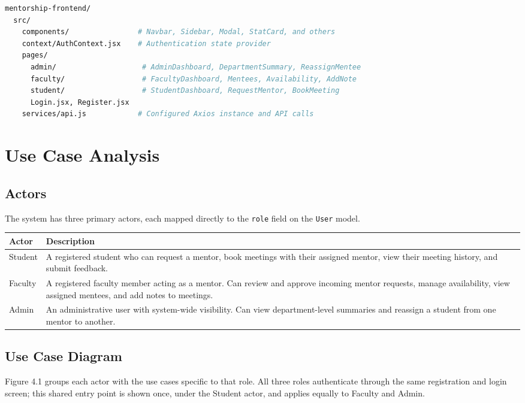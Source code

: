 \documentclass[12pt,a4paper]{report}
\newcommand{\sectionrule}{\vspace{-4pt}{\color{lightgray}\hrule height 1pt}\vspace{8pt}}
\begin{document}
\begin{lstlisting}[language=bash, caption={Frontend folder structure}]
mentorship-frontend/
  src/
    components/                # Navbar, Sidebar, Modal, StatCard, and others
    context/AuthContext.jsx    # Authentication state provider
    pages/
      admin/                    # AdminDashboard, DepartmentSummary, ReassignMentee
      faculty/                  # FacultyDashboard, Mentees, Availability, AddNote
      student/                  # StudentDashboard, RequestMentor, BookMeeting
      Login.jsx, Register.jsx
    services/api.js            # Configured Axios instance and API calls
\end{lstlisting}

\chapter{Use Case Analysis}

\section{Actors}
\sectionrule
The system has three primary actors, each mapped directly to the \texttt{role} field on the \texttt{User} model.

\begin{longtable}{@{}p{2.6cm}p{11cm}@{}}
\toprule
\textbf{Actor} & \textbf{Description} \\
\midrule
\endhead
Student & A registered student who can request a mentor, book meetings with their assigned mentor, view their meeting history, and submit feedback. \\
Faculty & A registered faculty member acting as a mentor. Can review and approve incoming mentor requests, manage availability, view assigned mentees, and add notes to meetings. \\
Admin & An administrative user with system-wide visibility. Can view department-level summaries and reassign a student from one mentor to another. \\
\bottomrule
\end{longtable}

\section{Use Case Diagram}
\sectionrule
Figure 4.1 groups each actor with the use cases specific to that role. All three roles authenticate through the same registration and login screen; this shared entry point is shown once, under the Student actor, and applies equally to Faculty and Admin.
\end{document}
